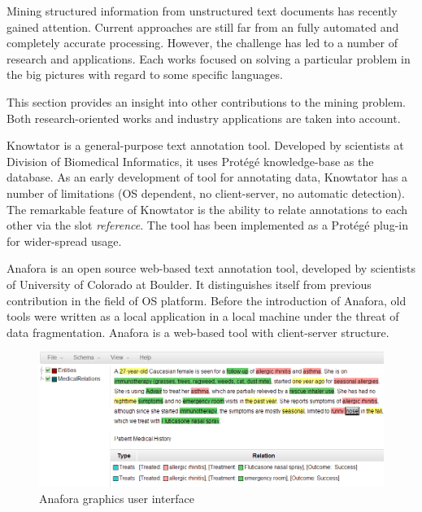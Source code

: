 
Mining structured information from unstructured text documents has recently gained attention. Current approaches are still 
far from an fully automated and completely accurate processing. However, the challenge has led to a number of research and 
applications. Each works focused on solving a particular problem in the big pictures with regard to some specific languages. 

This section provides an insight into other contributions to the mining problem. Both research-oriented works and 
industry applications are taken into account.

Knowtator is a general-purpose text annotation tool. Developed by scientists at Division of Biomedical Informatics, 
it uses Protégé knowledge-base as the database. As an early development of tool for annotating data, Knowtator has 
a number of limitations (OS dependent, no client-server, no automatic detection). The remarkable feature of Knowtator
is the ability to relate annotations to each other via the slot \textit{reference}.  The tool has been implemented as
a Protégé plug-in for wider-spread usage.



Anafora is an open source web-based text annotation tool, developed by scientists of  University of Colorado at Boulder. It 
distinguishes itself from previous contribution in the field of OS platform. Before the introduction of Anafora, old tools 
were written as a local application in a local machine under the threat of data fragmentation. Anafora is a web-based tool 
with client-server structure. %

\begin{figure}[!htb]
	\centering
	\includegraphics[width=\textwidth]{DeveloperDocumentationPictures/anafora}
	\caption{Anafora graphics user interface}
	\label{fig:First}
\end{figure}


